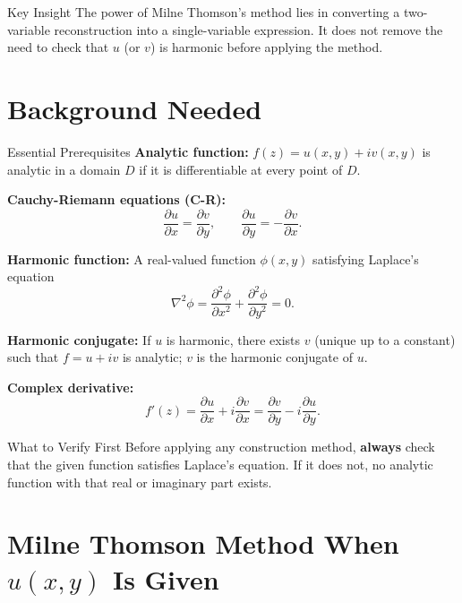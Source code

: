 \documentclass[12pt,a4paper]{article}
\begin{document}
\begin{learnbox}{Key Insight}
The power of Milne Thomson's method lies in converting a two-variable reconstruction into a single-variable expression. It does not remove the need to check that \( u \) (or \( v \)) is harmonic before applying the method.
\end{learnbox}

\section{Background Needed}

\begin{infobox}{Essential Prerequisites}
\textbf{Analytic function:} \( f(z) = u(x,y) + iv(x,y) \) is analytic in a domain \( D \) if it is differentiable at every point of \( D \).

\textbf{Cauchy-Riemann equations (C-R):}
\[
\frac{\partial u}{\partial x} = \frac{\partial v}{\partial y}, \qquad \frac{\partial u}{\partial y} = -\frac{\partial v}{\partial x}.
\]

\textbf{Harmonic function:} A real-valued function \( \phi(x,y) \) satisfying Laplace's equation
\[
\nabla^2 \phi = \frac{\partial^2 \phi}{\partial x^2} + \frac{\partial^2 \phi}{\partial y^2} = 0.
\]

\textbf{Harmonic conjugate:} If \( u \) is harmonic, there exists \( v \) (unique up to a constant) such that \( f = u + iv \) is analytic; \( v \) is the harmonic conjugate of \( u \).

\textbf{Complex derivative:}
\[
f'(z) = \frac{\partial u}{\partial x} + i\frac{\partial v}{\partial x} = \frac{\partial v}{\partial y} - i\frac{\partial u}{\partial y}.
\]
\end{infobox}

\begin{learnbox}{What to Verify First}
Before applying any construction method, \textbf{always} check that the given function satisfies Laplace's equation. If it does not, no analytic function with that real or imaginary part exists.
\end{learnbox}

\section{Milne Thomson Method When \texorpdfstring{\( u(x,y) \)}{u(x,y)} Is Given}
\end{document}
